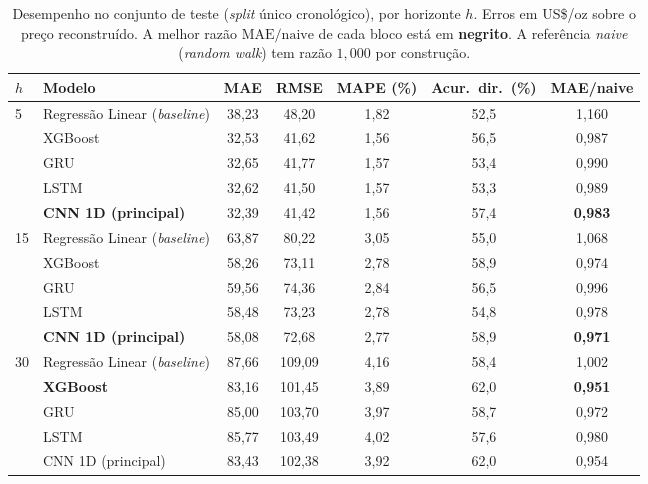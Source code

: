 \documentclass[12pt]{article}
\begin{document}
\begin{table}[H]
  \caption{Desempenho no conjunto de teste (\emph{split} único cronológico),
    por horizonte $h$. Erros em US\$/oz sobre o preço reconstruído. A melhor
    razão $\mathrm{MAE}/\mathrm{naive}$ de cada bloco está em \textbf{negrito}.
    A referência \emph{naive} (\emph{random walk}) tem razão $1{,}000$ por
    construção.}
  \label{tab:resultados}
  \centering
  \small
  \begin{tabular}{llccccc}
    \toprule
    $h$ & Modelo & MAE & RMSE & MAPE (\%) & Acur.\ dir.\ (\%) & MAE/naive \\
    \midrule
    \multirow{5}{*}{5}
      & Regressão Linear (\emph{baseline}) & 38{,}23 & 48{,}20 & 1{,}82 & 52{,}5 & 1{,}160 \\
      & XGBoost                            & 32{,}53 & 41{,}62 & 1{,}56 & 56{,}5 & 0{,}987 \\
      & GRU                                & 32{,}65 & 41{,}77 & 1{,}57 & 53{,}4 & 0{,}990 \\
      & LSTM                               & 32{,}62 & 41{,}50 & 1{,}57 & 53{,}3 & 0{,}989 \\
      & \textbf{CNN 1D (principal)}        & 32{,}39 & 41{,}42 & 1{,}56 & 57{,}4 & \textbf{0{,}983} \\
    \midrule
    \multirow{5}{*}{15}
      & Regressão Linear (\emph{baseline}) & 63{,}87 & 80{,}22 & 3{,}05 & 55{,}0 & 1{,}068 \\
      & XGBoost                            & 58{,}26 & 73{,}11 & 2{,}78 & 58{,}9 & 0{,}974 \\
      & GRU                                & 59{,}56 & 74{,}36 & 2{,}84 & 56{,}5 & 0{,}996 \\
      & LSTM                               & 58{,}48 & 73{,}23 & 2{,}78 & 54{,}8 & 0{,}978 \\
      & \textbf{CNN 1D (principal)}        & 58{,}08 & 72{,}68 & 2{,}77 & 58{,}9 & \textbf{0{,}971} \\
    \midrule
    \multirow{5}{*}{30}
      & Regressão Linear (\emph{baseline}) & 87{,}66 & 109{,}09 & 4{,}16 & 58{,}4 & 1{,}002 \\
      & \textbf{XGBoost}                   & 83{,}16 & 101{,}45 & 3{,}89 & 62{,}0 & \textbf{0{,}951} \\
      & GRU                                & 85{,}00 & 103{,}70 & 3{,}97 & 58{,}7 & 0{,}972 \\
      & LSTM                               & 85{,}77 & 103{,}49 & 4{,}02 & 57{,}6 & 0{,}980 \\
      & CNN 1D (principal)                 & 83{,}43 & 102{,}38 & 3{,}92 & 62{,}0 & 0{,}954 \\
    \bottomrule
  \end{tabular}
\end{table}
\end{document}
